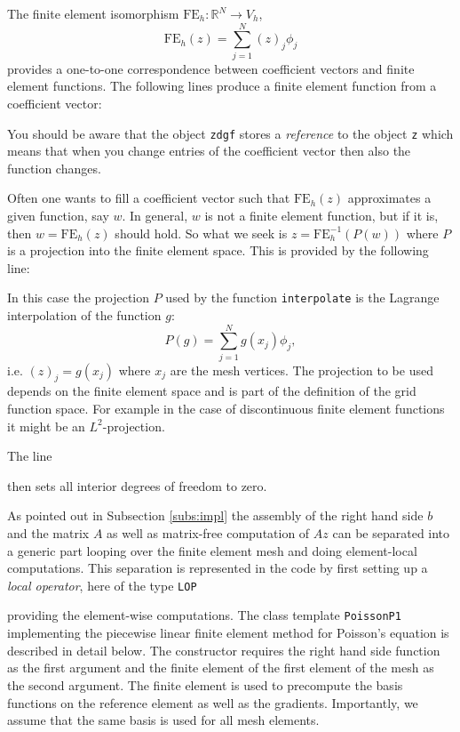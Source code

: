 \documentclass[a4paper,12pt]{article}
\begin{document}
The finite element isomorphism $\text{FE}_h : \mathbb{R}^N \to V_h$,
$$\text{FE}_h(z) = \sum_{j=1}^N (z)_j \phi_j$$ provides
a one-to-one correspondence between coefficient vectors and
finite element functions. The following lines produce
a finite element function from a coefficient vector:

You should be aware that the object \lstinline{zdgf} stores a {\em reference}
to the object \lstinline{z} which means that when you change entries of the
coefficient vector then also the function changes.

Often one wants to fill a coefficient vector such that $\text{FE}_h(z)$ approximates
a given function, say $w$. In general, $w$ is not a finite element function, but if it
is, then $w=\text{FE}_h(z)$ should hold. So what we seek is $z=\text{FE}_h^{-1}(P(w))$ where $P$ is 
a projection into the finite element space. This is provided by the following line:

In this case the projection $P$ used by the function \lstinline{interpolate} is
the Lagrange interpolation of the function $g$: 
$$P(g) = \sum_{j=1}^N g(x_j) \phi_j,$$ i.e. $(z)_j = g(x_j)$ where $x_j$
are the mesh vertices.
The projection to  be used depends on the finite element space and is
part of the definition of the grid function space. For example in the case
of discontinuous finite element functions it might be an $L^2$-projection.

The line

then sets all interior degrees of freedom to zero.

As pointed out in Subsection \ref{subs:impl} the assembly of the 
right hand side $b$ and the matrix $A$ as well as matrix-free computation of $Az$
can be separated into a generic part looping over the finite element mesh 
and doing element-local computations. This separation is represented in the code 
by first setting up a {\em local operator}, here of the type \lstinline{LOP}

providing the element-wise computations.
The class template \lstinline{PoissonP1}
implementing the piecewise linear finite element method for Poisson's equation
is described in detail below. The constructor
requires the right hand side function as the first argument and the 
finite element of the first element
of the mesh as the second argument. The finite element is used to
precompute the basis functions on the reference element as well as the gradients.
Importantly, we assume that the same basis is used for all mesh elements.
\end{document}

